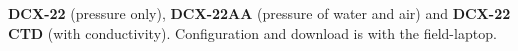 \documentclass[DIV=15,halfparskip,11pt,headinclude]{scrartcl}
\begin{document}

\textbf{DCX-22} (pressure only), \textbf{DCX-22AA} (pressure of water
and air) and \textbf{DCX-22 CTD} (with conductivity).  Configuration
and download is with the field-laptop.
\end{document}
